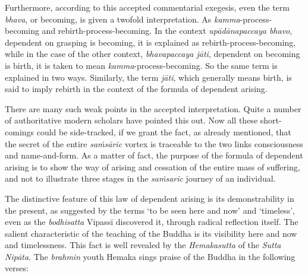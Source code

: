 Furthermore, according to this accepted commentarial exegesis, even the term \emph{bhava}, or becoming, is given a twofold interpretation. As \emph{kamma}-process-becoming and rebirth-process-becoming. In the context \emph{upādānapaccaya bhavo}, dependent on grasping is becoming, it is explained as rebirth-process-becoming, while in the case of the other context, \emph{bhavapaccaya jāti}, dependent on becoming is birth, it is taken to mean \emph{kamma}-process-becoming. So the same term is explained in two ways. Similarly, the term \emph{jāti}, which generally means birth, is said to imply rebirth in the context of the formula of dependent arising.

There are many such weak points in the accepted interpretation. Quite a number of authoritative modern scholars have pointed this out. Now all these short-comings could be side-tracked, if we grant the fact, as already mentioned, that the secret of the entire \emph{saṁsāric} vortex is traceable to the two links consciousness and name-and-form. As a matter of fact, the purpose of the formula of dependent arising is to show the way of arising and cessation of the entire mass of suffering, and not to illustrate three stages in the \emph{saṁsaric} journey of an individual.

The distinctive feature of this law of dependent arising is its demonstrability in the present, as suggested by the terms `to be seen here and now' and `timeless', even as the \emph{bodhisatta} Vipassī discovered it, through radical reflection itself. The salient characteristic of the teaching of the Buddha is its visibility here and now and timelessness. This fact is well revealed by the \emph{Hemakasutta} of the \emph{Sutta Nipāta}. The \emph{brahmin} youth Hemaka sings praise of the Buddha in the following verses:

